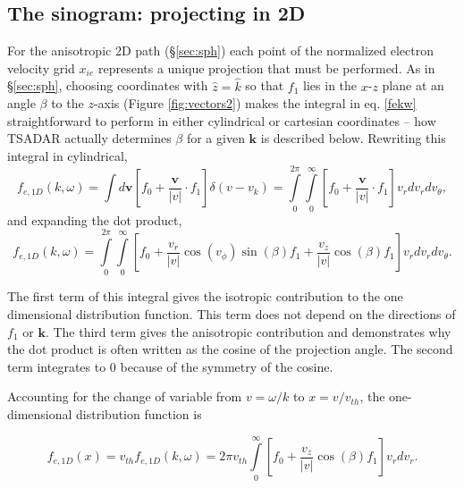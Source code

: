 \documentclass[11pt]{article}
\begin{document}
\subsection{The sinogram: projecting in 2D}

For the anisotropic 2D path (\S\ref{sec:sph}) each point of the normalized electron velocity grid $x_{ie}$ represents a unique projection that must be performed. As in \S\ref{sec:sph}, choosing coordinates with $\hat{z}=\hat{k}$ so that $f_1$ lies in the $x$-$z$ plane at an angle $\beta$ to the $z$-axis (Figure \ref{fig:vectors2}) makes the integral in eq. \ref{fekw} straightforward to perform in either cylindrical or cartesian coordinates -- how TSADAR actually determines $\beta$ for a given $\mathbf k$ is described below. Rewriting this integral in cylindrical,
\begin{equation}
    f_{e,1D}(k,\omega)=\int d\textbf{v} [f_0 +\frac{\textbf{v}}{|v|}\cdot f_{1}] \delta(v-v_k)=
    \int\limits_0^{2\pi}\int\limits_0^\infty [f_0 +\frac{\textbf{v}}{|v|}\cdot f_{1}] v_r dv_r dv_\theta,
\end{equation}
and expanding the dot product,
\begin{equation}
    f_{e,1D}(k,\omega)= \int\limits_0^{2\pi}\int\limits_0^\infty [f_0 +\frac{v_r}{|v|}\cos(v_{\phi}) \sin(\beta) f_{1} +\frac{v_z}{|v|} \cos(\beta) f_{1}] v_r dv_r dv_\theta.
\end{equation}

The first term of this integral gives the isotropic contribution to the one dimensional distribution function. This term does not depend on the directions of $f_1$ or $\textbf{k}$. The third term gives the anisotropic contribution and demonstrates why the dot product is often written as the cosine of the projection angle. The second term integrates to 0 because of the symmetry of the cosine.

Accounting for the change of variable from $v=\omega/k$ to $x=v/v_{th}$, the one-dimensional distribution function is

\begin{equation}\label{fex}
    f_{e,1D}(x)=v_{th} f_{e,1D}(k,\omega)=2\pi v_{th} \int\limits_0^\infty [f_0 +\frac{v_z}{|v|} \cos(\beta) f_{1}] v_r dv_r.
\end{equation}
\end{document}
